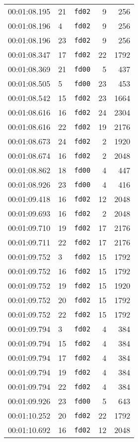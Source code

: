 \documentclass{article}
\begin{document}
\begin{longtable}{lllrr}
00:01:08.195 & 21 & \texttt{fd02} & 9 & 256 \\
00:01:08.196 & 4 & \texttt{fd02} & 9 & 256 \\
00:01:08.196 & 23 & \texttt{fd02} & 9 & 256 \\
00:01:08.347 & 17 & \texttt{fd02} & 22 & 1792 \\
00:01:08.369 & 21 & \texttt{fd00} & 5 & 437 \\
00:01:08.505 & 5 & \texttt{fd00} & 23 & 453 \\
00:01:08.542 & 15 & \texttt{fd02} & 23 & 1664 \\
00:01:08.616 & 16 & \texttt{fd02} & 24 & 2304 \\
00:01:08.616 & 22 & \texttt{fd02} & 19 & 2176 \\
00:01:08.673 & 24 & \texttt{fd02} & 2 & 1920 \\
00:01:08.674 & 16 & \texttt{fd02} & 2 & 2048 \\
00:01:08.862 & 18 & \texttt{fd00} & 4 & 447 \\
00:01:08.926 & 23 & \texttt{fd00} & 4 & 416 \\
00:01:09.418 & 16 & \texttt{fd02} & 12 & 2048 \\
00:01:09.693 & 16 & \texttt{fd02} & 2 & 2048 \\
00:01:09.710 & 19 & \texttt{fd02} & 17 & 2176 \\
00:01:09.711 & 22 & \texttt{fd02} & 17 & 2176 \\
00:01:09.752 & 3 & \texttt{fd02} & 15 & 1792 \\
00:01:09.752 & 16 & \texttt{fd02} & 15 & 1792 \\
00:01:09.752 & 19 & \texttt{fd02} & 15 & 1920 \\
00:01:09.752 & 20 & \texttt{fd02} & 15 & 1792 \\
00:01:09.752 & 22 & \texttt{fd02} & 15 & 1792 \\
00:01:09.794 & 3 & \texttt{fd02} & 4 & 384 \\
00:01:09.794 & 15 & \texttt{fd02} & 4 & 384 \\
00:01:09.794 & 17 & \texttt{fd02} & 4 & 384 \\
00:01:09.794 & 19 & \texttt{fd02} & 4 & 384 \\
00:01:09.794 & 22 & \texttt{fd02} & 4 & 384 \\
00:01:09.926 & 23 & \texttt{fd00} & 5 & 643 \\
00:01:10.252 & 20 & \texttt{fd02} & 22 & 1792 \\
00:01:10.692 & 16 & \texttt{fd02} & 12 & 2048 \\

\end{longtable}
\end{document}
